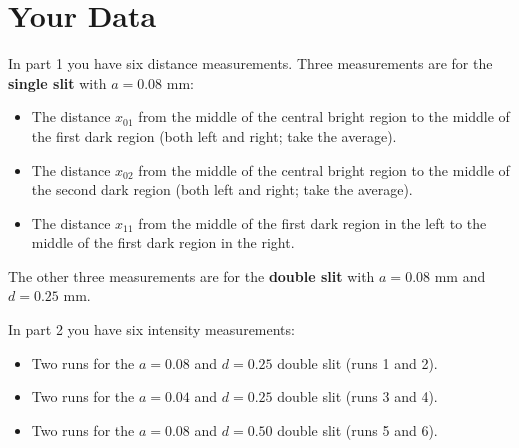 \section{Your Data}
%
In part 1 you have six distance measurements. Three measurements are for the \textbf{single slit} with $a = 0.08$ mm:
\begin{itemize}
	\item The distance $x_{01}$ from the middle of the central bright region to the middle of the first dark region (both left and right; take the average).
	\item The distance $x_{02}$ from the middle of the central bright region to the middle of the second dark region (both left and right; take the average).
	\item The distance $x_{11}$ from the middle of the first dark region in the left to the middle of the first dark region in the right.
\end{itemize}
The other three measurements are for the \textbf{double slit} with $a = 0.08$ mm and $d = 0.25$ mm.

In part 2 you have six intensity measurements:
\begin{itemize}
	\item Two runs for the $a = 0.08$ and $d = 0.25$ double slit (runs 1 and 2).
	\item Two runs for the $a = 0.04$ and $d = 0.25$ double slit (runs 3 and 4).
	\item Two runs for the $a = 0.08$ and $d = 0.50$ double slit (runs 5 and 6).
\end{itemize}
%
\newpage
